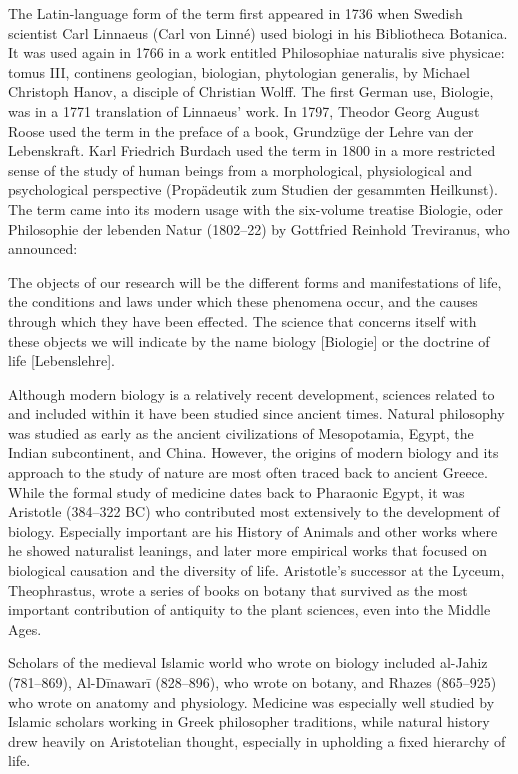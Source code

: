 \documentclass[
]{book}
\begin{document}
The Latin-language form of the term first appeared in 1736 when Swedish scientist Carl Linnaeus (Carl von Linné) used biologi in his Bibliotheca Botanica. It was used again in 1766 in a work entitled Philosophiae naturalis sive physicae: tomus III, continens geologian, biologian, phytologian generalis, by Michael Christoph Hanov, a disciple of Christian Wolff. The first German use, Biologie, was in a 1771 translation of Linnaeus' work. In 1797, Theodor Georg August Roose used the term in the preface of a book, Grundzüge der Lehre van der Lebenskraft. Karl Friedrich Burdach used the term in 1800 in a more restricted sense of the study of human beings from a morphological, physiological and psychological perspective (Propädeutik zum Studien der gesammten Heilkunst). The term came into its modern usage with the six-volume treatise Biologie, oder Philosophie der lebenden Natur (1802--22) by Gottfried Reinhold Treviranus, who announced:

The objects of our research will be the different forms and manifestations of life, the conditions and laws under which these phenomena occur, and the causes through which they have been effected. The science that concerns itself with these objects we will indicate by the name biology {[}Biologie{]} or the doctrine of life {[}Lebenslehre{]}.

Although modern biology is a relatively recent development, sciences related to and included within it have been studied since ancient times. Natural philosophy was studied as early as the ancient civilizations of Mesopotamia, Egypt, the Indian subcontinent, and China. However, the origins of modern biology and its approach to the study of nature are most often traced back to ancient Greece. While the formal study of medicine dates back to Pharaonic Egypt, it was Aristotle (384--322 BC) who contributed most extensively to the development of biology. Especially important are his History of Animals and other works where he showed naturalist leanings, and later more empirical works that focused on biological causation and the diversity of life. Aristotle's successor at the Lyceum, Theophrastus, wrote a series of books on botany that survived as the most important contribution of antiquity to the plant sciences, even into the Middle Ages.

Scholars of the medieval Islamic world who wrote on biology included al-Jahiz (781--869), Al-Dīnawarī (828--896), who wrote on botany, and Rhazes (865--925) who wrote on anatomy and physiology. Medicine was especially well studied by Islamic scholars working in Greek philosopher traditions, while natural history drew heavily on Aristotelian thought, especially in upholding a fixed hierarchy of life.
\end{document}
